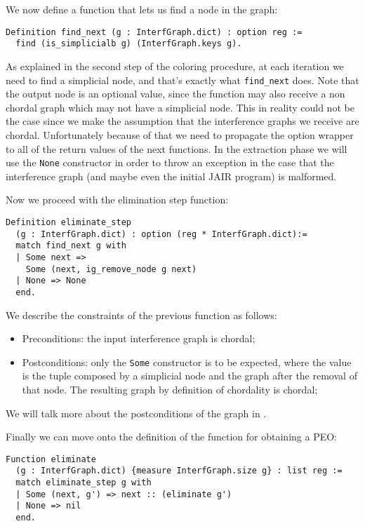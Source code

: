 We now define a function that lets us find a node in the graph:

\begin{lstlisting}[style=Coq]
Definition find_next (g : InterfGraph.dict) : option reg :=
  find (is_simplicialb g) (InterfGraph.keys g).
\end{lstlisting}

As explained in the second step of the coloring procedure, at each iteration we need to find a simplicial node, and that's exactly what \texttt{find\_next} does. Note that the output node is an optional value, since the function may also receive a non chordal graph which may not have a simplicial node. This in reality could not be the case since we make the assumption that the interference graphs we receive are chordal. Unfortunately because of that we need to propagate the option wrapper to all of the return values of the next functions.
In the extraction phase we will use the \texttt{None} constructor in order to throw an exception in the case that the interference graph (and maybe even the initial JAIR program) is malformed.

Now we proceed with the elimination step function:

\begin{lstlisting}[style=Coq]
Definition eliminate_step
  (g : InterfGraph.dict) : option (reg * InterfGraph.dict):=
  match find_next g with
  | Some next =>
    Some (next, ig_remove_node g next)
  | None => None
  end.
\end{lstlisting}

We describe the constraints of the previous function as follows:

\begin{itemize}
  \item Preconditions: the input interference graph is chordal;
  \item Postconditions: only the \texttt{Some} constructor is to be expected, where the value is the tuple composed by a simplicial node and the graph after the removal of that node. The resulting graph by definition of chordality is chordal;
\end{itemize}

We will talk more about the postconditions of the graph in .

Finally we can move onto the definition of the function for obtaining a PEO:

\begin{lstlisting}[style=Coq]
Function eliminate
  (g : InterfGraph.dict) {measure InterfGraph.size g} : list reg :=
  match eliminate_step g with
  | Some (next, g') => next :: (eliminate g')
  | None => nil
  end.
\end{lstlisting}

